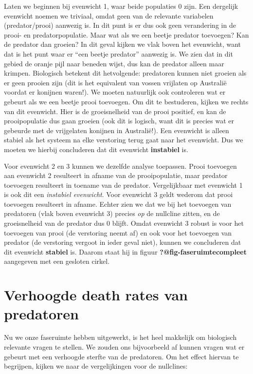 \documentclass[
  a4paper,
]{scrbook}
\theoremstyle{definition}
\theoremstyle{remark}
\begin{document}
Laten we beginnen bij evenwicht 1, waar beide populaties 0 zijn. Een
dergelijk evenwicht noemen we triviaal, omdat geen van de relevante
variabelen (predator/prooi) aanwezig is. In dit punt is er dus ook geen
verandering in de prooi- en predatorpopulatie. Maar wat als we een
beetje predator toevoegen? Kan de predator dan groeien? In dit geval
kijken we vlak boven het evenwicht, want dat is het punt waar er ``een
beetje predator'' aanwezig is. We zien dat in dit gebied de oranje pijl
naar beneden wijst, dus kan de predator alleen maar krimpen. Biologisch
betekent dit hetvolgende: predatoren kunnen niet groeien als er geen
prooien zijn (dit is het equivalent van vossen vrijlaten op Australië
voordat er konijnen waren!). We moeten natuurlijk ook controleren wat er
gebeurt als we een beetje prooi toevoegen. Om dit te bestuderen, kijken
we rechts van dit evenwicht. Hier is de groeisnelheid van de prooi
positief, en kan de prooipopulatie dus gaan groeien (ook dit is logisch,
want dit is precies wat er gebeurde met de vrijgelaten konijnen in
Australië!). Een evenwicht is alleen stabiel als het systeem na elke
verstoring terug gaat naar het evenwicht. Dus we moeten we hierbij
concluderen dat dit evenwicht \textbf{instabiel} is.

Voor evenwicht 2 en 3 kunnen we dezelfde analyse toepassen. Prooi
toevoegen aan evenwicht 2 resulteert in afname van de prooipopulatie,
maar predator toevoegen resulteert in toename van de predator.
Vergelijkbaar met evenwicht 1 is ook dit een \emph{instabiel evenwicht}.
Voor evenwicht 3 geldt wederom dat prooi toevoegen resulteert in afname.
Echter zien we dat we bij het toevoegen van predatoren (vlak boven
evenwicht 3) precies \emph{op} de nullcline zitten, en de groeisnelheid
van de predator dus 0 blijft. Omdat evenwicht 3 robust is voor het
toevoegen van prooi (de verstoring neemt af) en ook voor het toevoegen
van predator (de verstoring vergoot in ieder geval niet), kunnen we
concluderen dat dit evenwicht \textbf{stabiel} is. Daarom staat hij in
figuur \textbf{?@fig-faseruimtecompleet} aangegeven met een gesloten
cirkel.

\hypertarget{verhoogde-death-rates-van-predatoren}{%
\section{Verhoogde death rates van
predatoren}\label{verhoogde-death-rates-van-predatoren}}

Nu we onze faseruimte hebben uitgewerkt, is het heel makkelijk om
biologisch relevante vragen te stellen. We zouden ons bijvoorbeeld af
kunnen vragen wat er gebeurt met een verhoogde sterfte van de
predatoren. Om het effect hiervan te begrijpen, kijken we naar de
vergelijkingen voor de nullclines:
\end{document}

